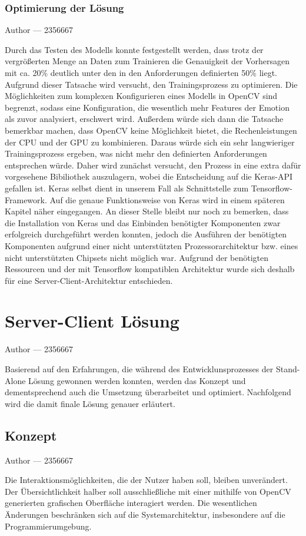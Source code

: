 \documentclass[12pt, a4paper]{report}
\makeatletter
\newcommand{\sectionauthor}[1]{%
  {\parindent0pt\vspace*{-5pt}%
  \large{Author --- }
  \linespread{1.1}\large\scshape#1%
  \par\nobreak\vspace*{35pt} }
  \@afterheading%
}
\newcommand{\chapterauthor}[1]{%
  {\parindent0pt\vspace*{-25pt}%
  \large{Author --- }
  \linespread{1.1}\large\scshape#1%
  \par\nobreak\vspace*{35pt} }
  \@afterheading%
}
\makeatother
\begin{document}
\subsection{Optimierung der Lösung}
\sectionauthor{2356667}
Durch das Testen des Modells konnte festgestellt werden, dass trotz der vergrößerten Menge an Daten zum Trainieren die Genauigkeit der Vorhersagen mit ca. 20\% deutlich unter den in den Anforderungen definierten 50\% liegt. Aufgrund dieser Tatsache wird versucht, den Trainingsprozess zu optimieren. Die Möglichkeiten zum komplexen Konfigurieren eines Modells in OpenCV sind begrenzt, sodass eine Konfiguration, die wesentlich mehr Features der Emotion als zuvor analysiert, erschwert wird. Außerdem würde sich dann die Tatsache bemerkbar machen, dass OpenCV keine Möglichkeit bietet, die  Rechenleistungen der CPU und der GPU zu kombinieren. Daraus würde sich ein sehr langwieriger Trainingsprozess ergeben, was nicht mehr den definierten Anforderungen entsprechen würde. Daher wird zunächst versucht, den Prozess in eine extra dafür vorgesehene Bibiliothek auszulagern, wobei die Entscheidung auf die Keras-API gefallen ist. Keras selbst dient in unserem Fall als Schnittstelle zum Tensorflow-Framework. Auf die genaue Funktionsweise von Keras wird in einem späteren Kapitel näher eingegangen. An dieser Stelle bleibt nur noch zu bemerken, dass die Installation von Keras und das Einbinden benötigter Komponenten zwar erfolgreich durchgeführt werden konnten, jedoch die Ausführen der benötigten Komponenten aufgrund einer nicht unterstützten Prozessorarchitektur bzw. eines nicht unterstützten Chipsets nicht möglich war. Aufgrund der benötigten Ressourcen und der mit Tensorflow kompatiblen Architektur wurde sich deshalb für eine Server-Client-Architektur entschieden.

\chapter{Server-Client Lösung}
\chapterauthor{2356667}
Basierend auf den Erfahrungen, die während des Entwicklunsprozesses der Stand-Alone Lösung gewonnen werden konnten, werden das Konzept und dementsprechend auch die Umsetzung überarbeitet und optimiert. Nachfolgend wird die damit finale Lösung genauer erläutert.

\section{Konzept}
\sectionauthor{2356667}
Die Interaktionsmöglichkeiten, die der Nutzer haben soll, bleiben unverändert. Der Übersichtlichkeit halber soll ausschließliche mit einer mithilfe von OpenCV generierten grafischen Oberfläche interagiert werden. Die wesentlichen Änderungen beschränken sich auf die Systemarchitektur, insbesondere auf die Programmierumgebung.
\end{document}
